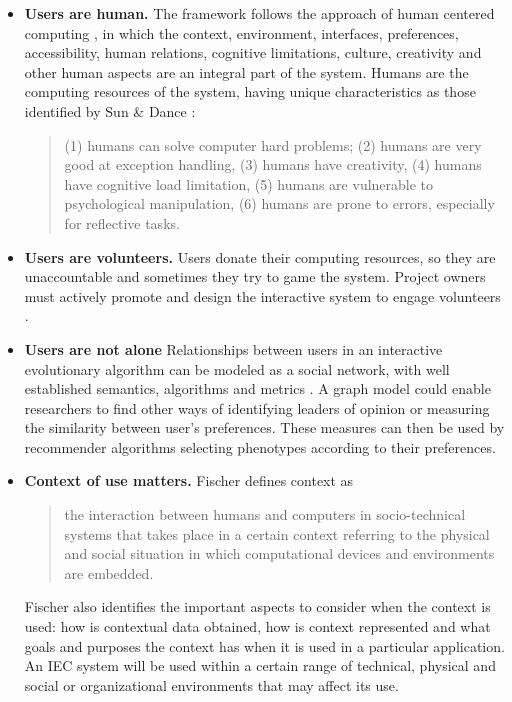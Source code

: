 \begin{itemize}
\item {\bf Users are human.} 
  The framework follows the approach of human centered computing \cite{sebe2010human},
  in which the context, environment, interfaces, preferences, accessibility, human relations,
  cognitive limitations, culture, creativity and other human aspects are an integral part 
  of the system. Humans are the computing resources of the system, having unique characteristics
  as those identified by Sun \& Dance \cite{Sun2013}:
\begin{quote}
  (1) humans can solve computer hard problems; (2) humans are very good at exception handling,
  (3) humans have creativity, (4) humans have cognitive load limitation, (5) humans are
  vulnerable to psychological manipulation, (6) humans are prone to errors,
  especially for reflective tasks.
\end{quote}  

\item {\bf Users are volunteers.} Users donate their computing resources, so they are 
unaccountable and sometimes they try to game the system. Project owners must actively promote and
design the interactive system to engage volunteers \cite{oh2015clicking}. %
\item {\bf Users are not alone}
  Relationships between users in an interactive evolutionary algorithm can be modeled
  as a social network, with well established semantics, algorithms and metrics 
  \cite{ahuja1993network}.
  A graph model could enable researchers to find other ways of identifying leaders of 
  opinion or measuring the similarity between user's preferences. 
  These measures can then be used by recommender algorithms selecting 
  phenotypes according to their preferences. 

\item {\bf Context of use matters.}
  Fischer \cite{fischer2012context}
  defines context as
  \begin{quote}
  the interaction between humans and
  computers in socio-technical systems that takes place in a certain
  context referring to the physical and social situation in which
  computational devices and environments are embedded.
\end{quote}   
  Fischer also identifies the important aspects to consider when the context is used: how is
  contextual data obtained, how is context represented and what
  goals and purposes the context has when it is used in a particular
  application. An IEC system will  be used within a certain range 
  of technical, physical and social or
  organizational environments \cite{maguire2001context} that may affect its use.
 

\end{itemize}
